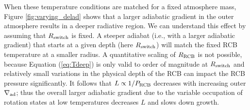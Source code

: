 \documentclass[apj]{emulateapj}
\newcommand{\delad}{\nabla_{\rm ad}}
\newcommand{\cb}{_{\rm RCB}}
\begin{document}
When these temperature conditions are matched for a fixed atmosphere mass, Figure \ref{fig:varying_delad} shows that a larger adiabatic gradient in the outer atmosphere results in a deeper radiative region. We can understand this effect by assuming that $R_{\rm switch}$ is fixed. A steeper adiabat (i.e., with a larger adiabatic gradient) that starts at a given depth (here $R_{\rm switch}$) will match the fixed RCB temperature at a smaller radius. A quantitative scaling of $R\cb$ is not possible, because Equation (\ref{eq:Tdeep})  is only valid to order of magnitude at $R_{\rm switch}$ and relatively small variations in the physical depth of the RCB can impact the RCB pressure significantly. It follows that $L \propto 1/P\cb$ decreases with increasing outer $\nabla_{\rm ad}$; thus the overall larger adiabatic gradient due to the variable occupation of rotation states at low temperatures decreases $L$ and slows down growth. 



\end{document}
